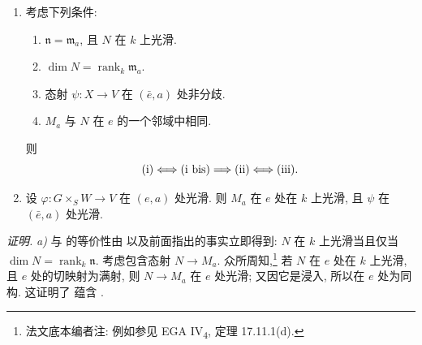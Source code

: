 \begin{enumerate}
\item[\textit{a)}]  考虑下列条件:
  \begin{enumerate}
  \item[(i)] 
    \(\mathfrak n=\mathfrak m_a\), 且 \(N\) 在 \(k\) 上光滑.
  \item[(i bis)] 
    \(\dim N=\operatorname{rank}_k\mathfrak m_a\).
  \item[(ii)] 
    态射 \(\psi:X\to V\) 在 \((\bar e,a)\) 处非分歧.
  \item[(iii)] 
    \(M_a\) 与 \(N\) 在 \(e\) 的一个邻域中相同.
  \end{enumerate}
  则
  \[
    \SGARefLink{sga3:xiii:lemma:1:1:item:i}{\mathrm{(i)}}\Longleftrightarrow\SGARefLink{sga3:xiii:lemma:1:1:item:i-bis}{\mathrm{(i\ bis)}}
    \Longrightarrow\SGARefLink{sga3:xiii:lemma:1:1:item:ii}{\mathrm{(ii)}}
    \Longleftrightarrow\SGARefLink{sga3:xiii:lemma:1:1:item:iii}{\mathrm{(iii)}}.
  \]
\item[\textit{b)}] 
  设 \(\varphi:G\times_S W\to V\) 在 \((e,a)\) 处光滑. 则 \(M_a\) 在 \(e\) 处在 \(k\) 上光滑, 且 \(\psi\) 在 \((\bar e,a)\) 处光滑.
\end{enumerate}

\noindent\textit{证明.}
\textit{a)}  与  的等价性由  以及前面指出的事实立即得到: \(N\) 在 \(k\) 上光滑当且仅当 \(\dim N=\operatorname{rank}_k\mathfrak n\). 考虑包含态射 \(N\to M_a\). 众所周知,\footnote{法文底本编者注: 例如参见 EGA IV\textsubscript{4}, 定理 17.11.1(d).} 若 \(N\) 在 \(e\) 处在 \(k\) 上光滑, 且 \(e\) 处的切映射为满射, 则 \(N\to M_a\) 在 \(e\) 处光滑; 又因它是浸入, 所以在 \(e\) 处为同构. 这证明了  蕴含 .

